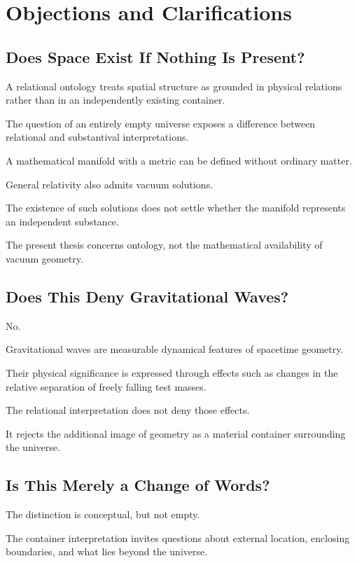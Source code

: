 \documentclass[12pt,onecolumn]{article}
\begin{document}
\section{Objections and Clarifications}

\subsection{Does Space Exist If Nothing Is Present?}

A relational ontology treats
spatial structure as grounded
in physical relations rather
than in an independently
existing container.

The question of an entirely
empty universe exposes a
difference between relational
and substantival interpretations.

A mathematical manifold
with a metric can be defined
without ordinary matter.

General relativity also
admits vacuum solutions.

The existence of such
solutions does not settle
whether the manifold represents
an independent substance.

The present thesis concerns
ontology, not the mathematical
availability of vacuum geometry.

\subsection{Does This Deny Gravitational Waves?}

No.

Gravitational waves are
measurable dynamical features
of spacetime geometry.

Their physical significance
is expressed through effects
such as changes in the relative
separation of freely falling
test masses.

The relational interpretation
does not deny those effects.

It rejects the additional
image of geometry as a material
container surrounding the
universe.

\subsection{Is This Merely a Change of Words?}

The distinction is conceptual,
but not empty.

The container interpretation
invites questions about
external location, enclosing
boundaries, and what lies
beyond the universe.
\end{document}
